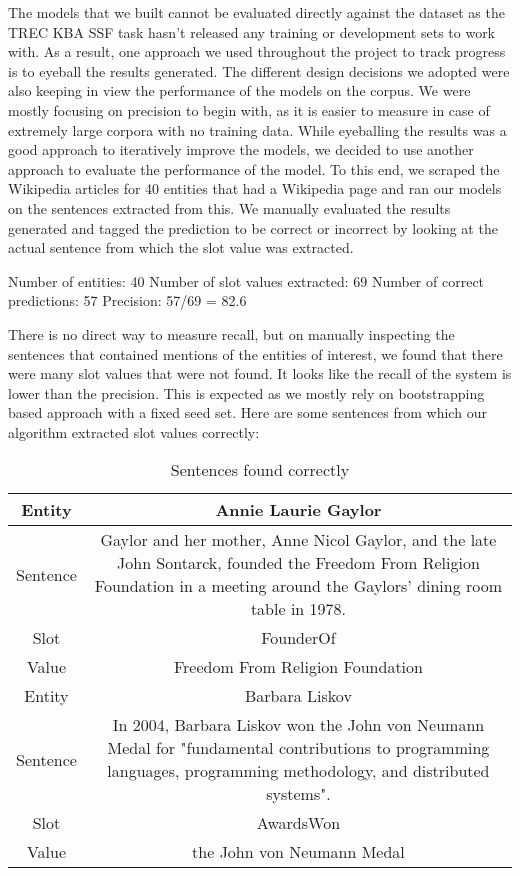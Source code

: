 The models that we built cannot be evaluated directly against the dataset as the TREC KBA SSF task hasn’t released any training or development sets to work with. As a result, one approach we used throughout the project to track progress is to eyeball the results generated. The different design decisions we adopted were also keeping in view the performance of the models on the corpus. We were mostly focusing on precision to begin with, as it is easier to measure in case of extremely large corpora with no training data. 
While eyeballing the results was a good approach to iteratively improve the models, we decided to use another approach to evaluate the performance of the model. To this end, we scraped the Wikipedia articles for 40 entities that had a Wikipedia page and ran our models on the sentences extracted from this. We manually evaluated the results generated and tagged the prediction to be correct or incorrect by looking at the actual sentence from which the slot value was extracted.

Number of entities: 40
Number of slot values extracted: 69
Number of correct predictions: 57
Precision: 57/69 = 82.6

There is no direct way to measure recall, but on manually inspecting the sentences that contained mentions of the entities of interest, we found that there were many slot values that were not found. It looks like the recall of the system is lower than the precision. This is expected as we mostly rely on bootstrapping based approach with a fixed seed set.
Here are some sentences from which our algorithm extracted slot values correctly:

\begin{table}[ht]
\centering
\begin{tabular}{|c|c|}
\hline
Entity & Annie Laurie Gaylor \\
\hline
Sentence & Gaylor and her mother, Anne Nicol Gaylor, and the late John Sontarck, founded the Freedom From Religion Foundation in a meeting around the Gaylors' dining room table in 1978.\\
\hline
Slot & FounderOf\\
\hline
Value & Freedom From Religion Foundation\\
\hline
\hline
Entity & Barbara Liskov \\
\hline
Sentence & In 2004, Barbara Liskov won the John von Neumann Medal for "fundamental contributions to programming languages, programming methodology, and distributed systems". \\
\hline
Slot & AwardsWon \\
\hline
Value & the John von Neumann Medal \\
\hline
\hline
\end{tabular}
\caption{Sentences found correctly}
\label{tab:model_correct}
\end{table}

